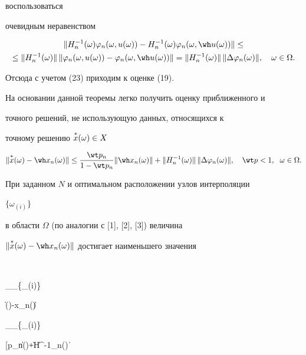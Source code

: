 \begin{pf}
воспользоваться


очевидным неравенством


\begin{multline*}


\|H^{-1}_n(\omega)\varphi_n(\omega,u(\omega))-


H^{-1}_n(\omega)\varphi_n(\omega,\wh u(\omega))\|\le \\


%


\le \|H^{-1}_n(\omega)\|\,\|\varphi_n(\omega,u(\omega))-


\varphi_n(\omega,\wh u(\omega))\|=


\|H^{-1}_n(\omega)\|\,\|\Delta\varphi_n(\omega)\|,\quad


\omega\in\Omega.


\end{multline*}


Отсюда с учетом (23) приходим к оценке (19).


\end{pf}





На основании данной теоремы легко получить оценку приближенного и


точного решений, не использующую данных, относящихся к


точному решению $\overset{*}{x}{}(\omega)\in X$


$$


\|\up{*}{x}(\omega)-\wh x_n(\omega)\|\le


\frac{\wt p_n}{1-\wt p_n}\|\wh x_n(\omega)\|+


\|H^{-1}_n(\omega)\|\,\|\Delta\varphi_n(\omega)\|,\quad


\wt p<1,\ \;\omega\in\Omega.


$$


При заданном $N$ и оптимальном расположении узлов интерполяции


$\{\omega_{(i)}\}$


в области $\Omega$ (по аналогии с [1], [2], [3]) величина


$\|\up{*}{x}(\omega)-\wh x_n(\omega)\|$ достигает наименьшего значения


$$


\sup_\omega\inf_{\{\omega_{(i)}\}}


\|(\omega)-\wh x_n(\omega)\|\le


\sup_\omega\inf_{\{\omega_{(i)}\}}


[\wt p_n\|(\omega)\|+\|H^{-1}_n(\omega)\|\,



